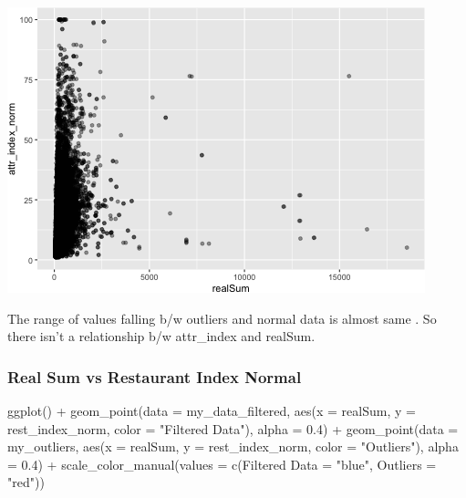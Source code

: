 \documentclass[
]{article}
\newenvironment{Shaded}{\begin{snugshade}}{\end{snugshade}}
\newcommand{\AttributeTok}[1]{\textcolor[rgb]{0.77,0.63,0.00}{#1}}
\newcommand{\FloatTok}[1]{\textcolor[rgb]{0.00,0.00,0.81}{#1}}
\newcommand{\FunctionTok}[1]{\textcolor[rgb]{0.00,0.00,0.00}{#1}}
\newcommand{\NormalTok}[1]{#1}
\newcommand{\OtherTok}[1]{\textcolor[rgb]{0.56,0.35,0.01}{#1}}
\newcommand{\SpecialCharTok}[1]{\textcolor[rgb]{0.00,0.00,0.00}{#1}}
\newcommand{\StringTok}[1]{\textcolor[rgb]{0.31,0.60,0.02}{#1}}
\begin{document}
\includegraphics{Project_files/figure-latex/unnamed-chunk-16-3.png}

The range of values falling b/w outliers and normal data is almost same
. So there isn't a relationship b/w attr\_index and realSum.

\hypertarget{real-sum-vs-restaurant-index-normal}{%
\subsubsection{Real Sum vs Restaurant Index
Normal}\label{real-sum-vs-restaurant-index-normal}}

\begin{Shaded}
\begin{Highlighting}[]
\FunctionTok{ggplot}\NormalTok{() }\SpecialCharTok{+} \FunctionTok{geom\_point}\NormalTok{(}\AttributeTok{data =}\NormalTok{ my\_data\_filtered, }\FunctionTok{aes}\NormalTok{(}\AttributeTok{x =}\NormalTok{ realSum,}
    \AttributeTok{y =}\NormalTok{ rest\_index\_norm, }\AttributeTok{color =} \StringTok{"Filtered Data"}\NormalTok{), }\AttributeTok{alpha =} \FloatTok{0.4}\NormalTok{) }\SpecialCharTok{+}
    \FunctionTok{geom\_point}\NormalTok{(}\AttributeTok{data =}\NormalTok{ my\_outliers, }\FunctionTok{aes}\NormalTok{(}\AttributeTok{x =}\NormalTok{ realSum, }\AttributeTok{y =}\NormalTok{ rest\_index\_norm,}
        \AttributeTok{color =} \StringTok{"Outliers"}\NormalTok{), }\AttributeTok{alpha =} \FloatTok{0.4}\NormalTok{) }\SpecialCharTok{+} \FunctionTok{scale\_color\_manual}\NormalTok{(}\AttributeTok{values =} \FunctionTok{c}\NormalTok{(}\StringTok{\textasciigrave{}}\AttributeTok{Filtered Data}\StringTok{\textasciigrave{}} \OtherTok{=} \StringTok{"blue"}\NormalTok{,}
    \AttributeTok{Outliers =} \StringTok{"red"}\NormalTok{))}
\end{Highlighting}
\end{Shaded}
\end{document}
